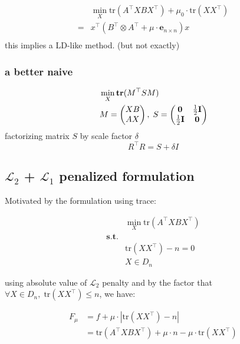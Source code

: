 \documentclass[
  10pt,
  a4paper,
,tablecaptionabove
]{scrartcl}
\begin{document}
\[\begin{aligned}
&\min_X\textrm{tr}(A^\top XB X^\top) + \mu_0 \cdot \textrm{tr}(X X^{\top}) \\
= & x^\top (B^\top \otimes A^\top + \mu\cdot  \mathbf e_{n\times n}) x\\ 
\end{aligned} \] this implies a LD-like method. (but not exactly)

\hypertarget{a-better-naive}{%
\subsubsection{a better naive}\label{a-better-naive}}

\[\begin{aligned}
&\min_X \mathbf{tr}(M^\top SM) \\&M=\begin{pmatrix}XB\\AX\end{pmatrix},\; S = \begin{pmatrix}\bf{0} & \frac{1}{2}\mathbf{I}\\\frac{1}{2}\mathbf{I} & \bf{0} \end{pmatrix} 
\end{aligned}\] factorizing matrix \(S\) by scale factor \(\delta\)
\[R^\top R = S + \delta I\]

\hypertarget{mathscr-l_2-mathscr-l_1-penalized-formulation}{%
\subsection{\texorpdfstring{\(\mathscr L_2\) + \(\mathscr L_1\)
penalized
formulation}{\textbackslash mathscr L\_2 + \textbackslash mathscr L\_1 penalized formulation}}\label{mathscr-l_2-mathscr-l_1-penalized-formulation}}

Motivated by the formulation using trace:

\[\begin{aligned}
& \min_X  \textrm{tr}(A^\top XB X^\top) \\
\mathbf{s.t.} &\\
&   \textrm{tr}(XX^\top ) -  n = 0 \\
& X \in D_n
\end{aligned}\]

using absolute value of \(\mathscr L_2\) penalty and by the factor that
\(\forall X \in D_n ,\; \textrm{tr}(XX^\top)\le n\), we have:

\[\begin{aligned}
F_{\mu} & =  f  + \mu\cdot | \textrm{tr}(XX^\top ) -  n| \\
 &= \textrm{tr}(A^\top XB X^\top)  + \mu\cdot n - \mu\cdot \textrm{tr}(XX^\top )
\end{aligned}\]
\end{document}
